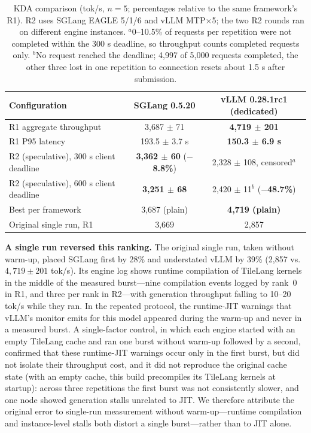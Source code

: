 \documentclass[11pt]{article}
\newcommand{\tps}{tok/s\xspace}
\begin{document}
\begin{table}[t]
\centering
\small
\begin{tabular}{lcc}
\toprule
\textbf{Configuration} & \textbf{SGLang 0.5.20} & \textbf{vLLM 0.28.1rc1 (dedicated)} \\
\midrule
R1 aggregate throughput & 3,687 $\pm$ 71 & \textbf{4,719 $\pm$ 201} \\
R1 P95 latency & 193.5 $\pm$ 3.7 s & \textbf{150.3 $\pm$ 6.9 s} \\
R2 (speculative), 300 s client deadline & \textbf{3,362 $\pm$ 60} (\textbf{$-$8.8\%}) & 2,328 $\pm$ 108, censored$^{a}$ \\
R2 (speculative), 600 s client deadline & \textbf{3,251 $\pm$ 68} & 2,420 $\pm$ 11$^{b}$ (\textbf{$-$48.7\%}) \\
Best per framework & 3,687 (plain) & \textbf{4,719 (plain)} \\
Original single run, R1 & 3,669 & 2,857 \\
\bottomrule
\end{tabular}
\caption{KDA comparison (\tps, $n=5$; percentages relative to the same framework's R1). R2 uses SGLang EAGLE 5/1/6 and vLLM MTP$\times$5; the two R2 rounds ran on different engine instances. $^{a}$0--10.5\% of requests per repetition were not completed within the 300 s deadline, so throughput counts completed requests only. $^{b}$No request reached the deadline; 4,997 of 5,000 requests completed, the other three lost in one repetition to connection resets about 1.5 s after submission.}
\label{tab:kda}
\end{table}

\textbf{A single run reversed this ranking.} The original single run, taken without warm-up, placed SGLang first by 28\% and understated vLLM by 39\% (2,857 vs.\ $4{,}719 \pm 201$ \tps). Its engine log shows runtime compilation of TileLang kernels in the middle of the measured burst---nine compilation events logged by rank~0 in R1, and three per rank in R2---with generation throughput falling to 10--20 \tps{} while they ran. In the repeated protocol, the runtime-JIT warnings that vLLM's monitor emits for this model appeared during the warm-up and never in a measured burst. A single-factor control, in which each engine started with an empty TileLang cache and ran one burst without warm-up followed by a second, confirmed that these runtime-JIT warnings occur only in the first burst, but did not isolate their throughput cost, and it did not reproduce the original cache state (with an empty cache, this build precompiles its TileLang kernels at startup): across three repetitions the first burst was not consistently slower, and one node showed generation stalls unrelated to JIT. We therefore attribute the original error to single-run measurement without warm-up---runtime compilation and instance-level stalls both distort a single burst---rather than to JIT alone.
\end{document}
